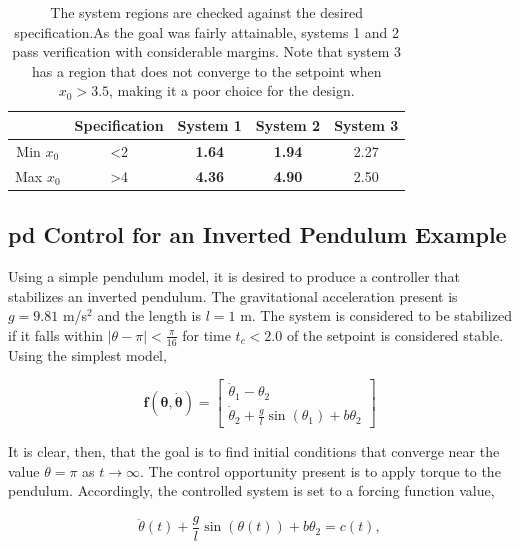 \begin{table}[h]
    \centering
    \begin{tabular}{c||c||c|c|c}
    & Specification & System 1 & System 2 & System 3  \\ \hline \hline
    Min $x_0$ &  <2 &  \textbf{1.64} & \textbf{1.94} & 2.27 \\ \hline
    Max $x_0$ & >4 &  \textbf{4.36} & \textbf{4.90} & 2.50 \\ \hline 
    \end{tabular}
    \caption{The system regions are checked against the desired specification.As the goal was fairly attainable, systems 1 and 2 pass verification with considerable margins. Note that system 3 has a region that does not converge to the setpoint when $x_0 > 3.5$, making it a poor choice for the design. }
    \label{tab:fregions}
\end{table}

\subsection{\gls{pd} Control for an Inverted Pendulum Example}

Using a simple pendulum model, it is desired to produce a controller that stabilizes an inverted pendulum. The gravitational acceleration present is $g=9.81$ m/s$^2$ and the length is $l=1$ m. The system is considered to be stabilized if it falls within $|\theta - \pi| < \frac{\pi}{16}$ for time $t_c < 2.0$ of the setpoint is considered stable. Using the simplest model,

\begin{equation}
    \bm{f}\left( {\bm{\theta} ,\dot{\bm{\theta}} } \right) = \left[ {\begin{array}{*{20}{c}}
  {{{\dot \theta }_1} - {\theta _2}} \\ 
  {{{\dot \theta }_2} + \frac{g}{l}\sin \left( {{\theta _1}} \right)} + b \theta_2
\end{array}} \right]
\end{equation}

It is clear, then, that the goal is to find initial conditions that converge near the value $\theta = \pi$ as $t \rightarrow \infty $. The control opportunity present is to apply torque to the pendulum. Accordingly, the controlled system is set to a forcing function value,

\begin{equation}
    \ddot \theta (t) + \frac{g}{l}\sin \left( {\theta (t)} \right)  + b \theta_2 = c(t),
\end{equation}

